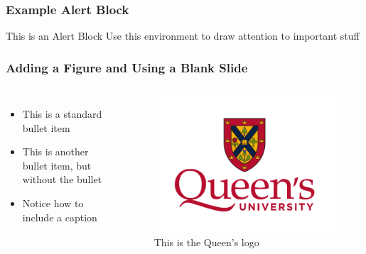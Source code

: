\documentclass[fleqn]{qu-slides}
\begin{document}

\SlideWhite
\begin{frame}[fragile]
    \frametitle{Example Alert Block}
    \begin{alertblock}{This is an Alert Block}
        Use this environment to draw attention to important stuff
    \end{alertblock}
\end{frame}


\SlideWhite
\begin{frame}
    \frametitle{Adding a Figure and Using a Blank Slide}
    \begin{columns}
        \begin{itemize}
            \item This is a standard bullet item
            \item[] This is another bullet item, but without the bullet
            \item Notice how to include a caption
        \end{itemize}
        \begin{figure}
            \flushleft
            \includegraphics[width=1.0\columnwidth]{logo/qu-logo-vertical-colour.pdf}
            \caption{This is the Queen's logo}
        \end{figure}
    \end{columns}
\end{frame}
\end{document}
